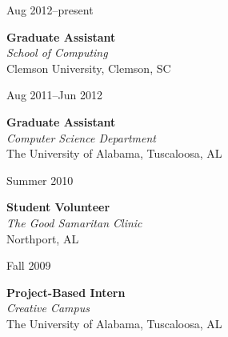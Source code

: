 \documentclass[11pt]{simplecv}
\newcommand{\stitle}{\textbf}
\newcommand{\splace}{\textit}
\newif\ifcv
\begin{document}
\begin{topic}

\item[Aug 2012--present] {
  \stitle{Graduate Assistant} \\
  \splace{School of Computing} \\
  Clemson University, Clemson, SC

\ifcv
  \begin{itemize}
    \item Led lab and graded for an intermediate programming course.
  \end{itemize}
\fi
}

\item[Aug 2011--Jun 2012] {
  \stitle{Graduate Assistant} \\
  \splace{Computer Science Department} \\
  The University of Alabama, Tuscaloosa, AL

\ifcv
  \begin{itemize}
    \item Research in robotics software/middleware
    \item Lectured and graded for undergraduate data structures/algorithms course.
    \item Graded for undergraduate/graduate algorithms course.
    \item Lectured and graded for Programming II course.
  \end{itemize}
\fi
}

\item[Summer 2010] {
	\stitle{Student Volunteer} \\
	\splace{The Good Samaritan Clinic} \\
	Northport, AL

\ifcv
	\begin{itemize}
		\item Performed triage procedures for incoming patients.
	\end{itemize}
\fi
}

\item [Fall 2009] {
	\stitle{Project-Based Intern} \\
	\splace{Creative Campus} \\
	The University of Alabama, Tuscaloosa, AL
	
\ifcv
	\begin{itemize}
		\item Organized weeklong game development workshop.
	\end{itemize}
\fi
}



\end{topic}
\end{document}

